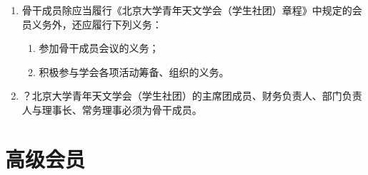 \begin{enumerate}[resume]
    \item 骨干成员除应当履行《北京大学青年天文学会（学生社团）章程》中规定的会员义务外，还应履行下列义务：
    \begin{enumerate}
        \item 参加骨干成员会议的义务；
        \item 积极参与学会各项活动筹备、组织的义务。
    \end{enumerate}
    
    \item ？北京大学青年天文学会（学生社团）的主席团成员、财务负责人、部门负责人与理事长、常务理事必须为骨干成员。
\end{enumerate}

\section{高级会员}

